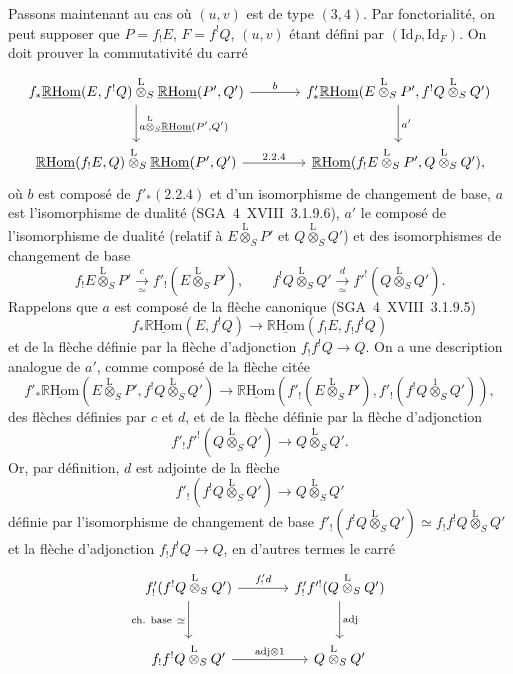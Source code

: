 \documentclass[11pt]{article}
\newcommand{\R}{\mathbb{R}}\newcommand{\RHomCore}{\mathbb{R}\mathrm{Hom}}
\providecommand{\RHom}{\RHomCore}
\providecommand{\uRHom}{\underline{\RHom}}
\providecommand{\Id}{\mathrm{Id}}
\providecommand{\RHom}{\RHomCore}
\providecommand{\RHom}{\R\mathcal{H}om}
\providecommand{\R}{\mathrm R}
\providecommand{\RHom}{\RHomCore}
\begin{document}
Passons maintenant au cas où $(u,v)$ est de type $(3,4)$. Par fonctorialité, on peut supposer que $P=f_{!}E$, $F=f^{!}Q$, $(u,v)$ étant défini par $(\Id_P,\Id_F)$. On doit prouver la commutativité du carré
\[
\begin{tikzcd}[
column sep=large,row sep=large]
f_*\uRHom(E,f^!Q)\overset{\mathrm{L}}{\otimes}_S\uRHom(P',Q') \arrow[r,"b"] \arrow[d,"{a\overset{\mathrm{L}}{\otimes}_S\uRHom(P',Q')}"] & f'_*\uRHom(E\overset{\mathrm{L}}{\otimes}_SP',f^!Q\overset{\mathrm{L}}{\otimes}_SQ') \arrow[d,"a'"]\\
\uRHom(f_!E,Q)\overset{\mathrm{L}}{\otimes}_S\uRHom(P',Q') \arrow[r,"2.2.4"] & \uRHom(f_!E\overset{\mathrm{L}}{\otimes}_SP',Q\overset{\mathrm{L}}{\otimes}_SQ'),
\end{tikzcd}
\]
où $b$ est composé de $f'_*(2.2.4)$ et d'un isomorphisme de changement de base, $a$ est l'isomorphisme de dualité (SGA~4~XVIII~3.1.9.6), $a'$ le composé de l'isomorphisme de dualité (relatif à $E\overset{\mathrm{L}}{\otimes}_SP'$ et $Q\overset{\mathrm{L}}{\otimes}_SQ'$) et des isomorphismes de changement de base
\[
f_!E\overset{\mathrm{L}}{\otimes}_SP'\xrightarrow[\simeq]{c}f'_!(E\overset{\mathrm{L}}{\otimes}_SP'),
\qquad
f^!Q\overset{\mathrm{L}}{\otimes}_SQ'\xrightarrow[\simeq]{d}f'^!(Q\overset{\mathrm{L}}{\otimes}_SQ').
\]
Rappelons que $a$ est composé de la flèche canonique (SGA~4~XVIII~3.1.9.5)
\[
f_*\uRHom(E,f^!Q)\longrightarrow\uRHom(f_!E,f_!f^!Q)
\]
et de la flèche définie par la flèche d'adjonction $f_!f^!Q\to Q$. On a une description analogue de $a'$, comme composé de la flèche citée
\begin{equation}\tag{*}
f'_*\uRHom(E\overset{\mathrm{L}}{\otimes}_SP',f^!Q\overset{\mathrm{L}}{\otimes}_SQ')\longrightarrow
\uRHom(f'_!(E\overset{\mathrm{L}}{\otimes}_SP'),f'_!(f^!Q\overset{1}{\otimes}_SQ')),
\end{equation}
des flèches définies par $c$ et $d$, et de la flèche définie par la flèche d'adjonction
\[
f'_!f'^!(Q\overset{\mathrm{L}}{\otimes}_SQ')\longrightarrow Q\overset{\mathrm{L}}{\otimes}_SQ'.
\]
Or, par définition, $d$ est adjointe de la flèche
\[
f'_!(f^!Q\overset{\mathrm{L}}{\otimes}_SQ')\longrightarrow Q\overset{\mathrm{L}}{\otimes}_SQ'
\]
définie par l'isomorphisme de changement de base $f'_!(f^!Q\overset{\mathrm{L}}{\otimes}_SQ')\simeq f_!f^!Q\overset{\mathrm{L}}{\otimes}_SQ'$ et la flèche d'adjonction $f_!f^!Q\to Q$, en d'autres termes le carré
\[
\begin{tikzcd}[column sep=large,row sep=large]
f'_!(f^!Q\overset{\mathrm{L}}{\otimes}_SQ') \arrow[r,"{f'_!d}"] \arrow[d,"{\text{ch. base}\ \simeq}"'] & f'_!f'^!(Q\overset{\mathrm{L}}{\otimes}_SQ') \arrow[d,"\mathrm{adj}"]\\
f_!f^!Q\overset{\mathrm{L}}{\otimes}_SQ' \arrow[r,"{\mathrm{adj}\otimes 1}"] & Q\overset{\mathrm{L}}{\otimes}_SQ'
\end{tikzcd}
\]
\end{document}
